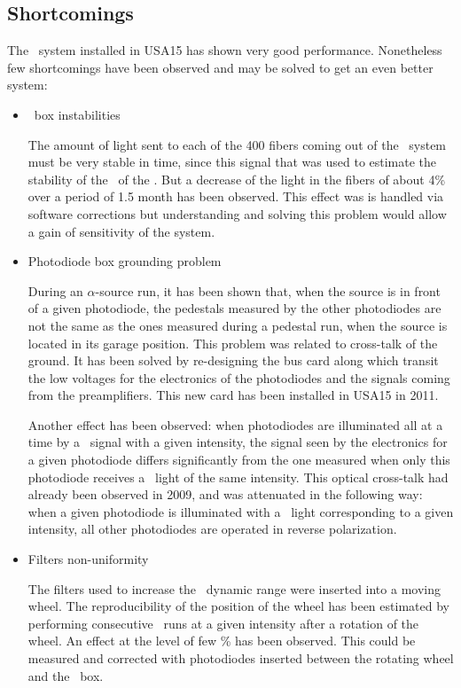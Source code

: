 \subsection{Shortcomings}
The \las~system installed in USA15 has shown very good performance. Nonetheless few shortcomings have been observed and may be solved to get an even better system:
\begin{itemize}
\item{\coimbra~box instabilities} 
	
The amount of light sent to each of the 400 fibers coming out of the \coimbra~system must be very stable in time, since this signal that was used to estimate the stability of the \pmts~of the \tilecal. But a decrease of the light in the fibers of about 4\% over a period of 1.5 month has been observed. This effect was is handled via software corrections but understanding and solving this problem would allow a gain of sensitivity of the system.
	
\item{Photodiode box grounding problem} 
	
During an $\alpha$-source run, it has been shown that, when the source is in front of a given photodiode, the pedestals measured by the other photodiodes are not the same as the ones measured during a pedestal run, when the source is located in its garage position. This problem was related to cross-talk of the ground. It has been solved by re-designing the bus card along which transit the low voltages for the electronics of the photodiodes and the signals coming from the preamplifiers. This new card has been installed in USA15 in 2011. \par
Another effect has been observed: when photodiodes are illuminated all at a time by a \las~signal with a given intensity, the signal seen by the electronics for a given photodiode differs significantly from the one measured when only this photodiode receives a \las~light of the same intensity. This optical cross-talk had already been observed in 2009, and was attenuated in the following way: when a given photodiode is illuminated with a \las~light corresponding to a given intensity, all other photodiodes are operated in reverse polarization.
		
\item{Filters non-uniformity}
	
The filters used to increase the \las~dynamic range were inserted into a moving wheel. The reproducibility of the position of the wheel has been estimated by performing consecutive \las~runs at a given intensity after a rotation of the wheel. An effect at the level of few \% has been observed. This could be measured and corrected with photodiodes inserted between the rotating wheel and the \coimbra~box.
	

\end{itemize}
